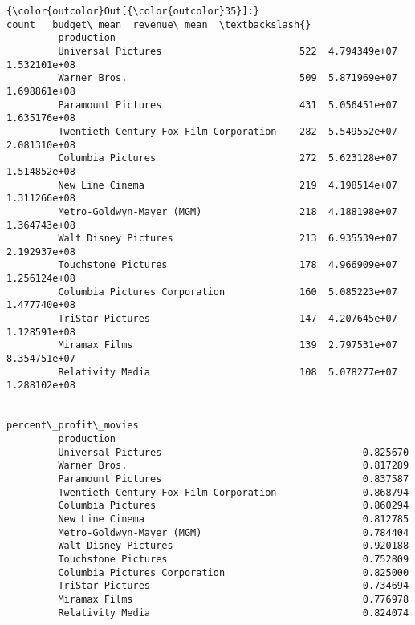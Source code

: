 \documentclass[11pt]{article}
\begin{document}
\begin{Verbatim}[commandchars=\\\{\}]
{\color{outcolor}Out[{\color{outcolor}35}]:}                                         count   budget\_mean  revenue\_mean  \textbackslash{}
         production                                                                  
         Universal Pictures                        522  4.794349e+07  1.532101e+08   
         Warner Bros.                              509  5.871969e+07  1.698861e+08   
         Paramount Pictures                        431  5.056451e+07  1.635176e+08   
         Twentieth Century Fox Film Corporation    282  5.549552e+07  2.081310e+08   
         Columbia Pictures                         272  5.623128e+07  1.514852e+08   
         New Line Cinema                           219  4.198514e+07  1.311266e+08   
         Metro-Goldwyn-Mayer (MGM)                 218  4.188198e+07  1.364743e+08   
         Walt Disney Pictures                      213  6.935539e+07  2.192937e+08   
         Touchstone Pictures                       178  4.966909e+07  1.256124e+08   
         Columbia Pictures Corporation             160  5.085223e+07  1.477740e+08   
         TriStar Pictures                          147  4.207645e+07  1.128591e+08   
         Miramax Films                             139  2.797531e+07  8.354751e+07   
         Relativity Media                          108  5.078277e+07  1.288102e+08   
         
                                                 percent\_profit\_movies  
         production                                                     
         Universal Pictures                                   0.825670  
         Warner Bros.                                         0.817289  
         Paramount Pictures                                   0.837587  
         Twentieth Century Fox Film Corporation               0.868794  
         Columbia Pictures                                    0.860294  
         New Line Cinema                                      0.812785  
         Metro-Goldwyn-Mayer (MGM)                            0.784404  
         Walt Disney Pictures                                 0.920188  
         Touchstone Pictures                                  0.752809  
         Columbia Pictures Corporation                        0.825000  
         TriStar Pictures                                     0.734694  
         Miramax Films                                        0.776978  
         Relativity Media                                     0.824074  
\end{Verbatim}
            
\end{document}
